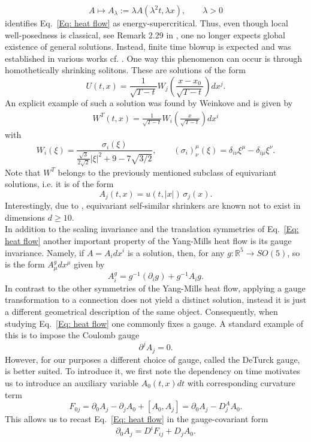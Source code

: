 \documentclass[11pt,reqno]{amsart}
\theoremstyle{remark}
\newcommand{\R}{\mathbb{R}}
\theoremstyle{definition}
\begin{document}
$$
A \mapsto A_\lambda:= \lambda A(\lambda^2 t, \lambda x),\qquad \lambda>0
$$
identifies Eq.~\eqref{Eq: heat flow} as energy-supercritical. Thus, even though local well-posedness is classical, see Remark 2.29 in \cite{OhTat22}, one no longer expects global existence of general solutions. Instead, finite time blowup is expected and was established in various works cf. \cite{Nai94,Gro01,Gas02,Wan25}. One way this phenomenon can occur is through homothetically shrinking solitons. These are solutions of the form 
$$
U(t,x)=\frac{1}{\sqrt{T-t}}W_j\left(\frac{x-x_0}{\sqrt{T-t}}\right) dx^j.
$$
An explicit example of such a solution was found by Weinkove \cite{Wei04} and is given by
\begin{align}\label{Eq; Weinkove}
W^T(t,x)=\frac{1}{\sqrt{T-t}} W_i(\frac{x}{\sqrt{T-t}}) dx^i
\end{align}
with
$$
W_i(\xi)= \frac{\sigma_i(\xi)}{\frac{\sqrt{3}}{2\sqrt{2}}|\xi|^2+9-7\sqrt{3/2}},\qquad (\sigma_i)_{\nu}^\mu(\xi)=\delta_{i\nu}\xi^\mu-\delta_{i\mu}\xi^\nu.
$$
Note that $W^T$ belongs to the previously mentioned subclass of equivariant solutions, i.e. it is of the form
\[
A_j(t,x)=u(t,|x|)\,\sigma_j(x).
\]
Interestingly, due to \cite{BizWas15}, equivariant self-similar shrinkers are known not to exist in dimensions $d\geq 10$. 
\\
In addition to the scaling invariance and the translation symmetries of Eq.~\eqref{Eq: heat flow} another important property of the Yang-Mills heat flow is its gauge invariance.
Namely, if $A=A_i dx^i$ is a solution, then, for any $g:\R^5 \to SO(5)$, so is the form $A_\mu^g dx^\mu$ given by
$$
A_i^g = g^{-1}(\partial_i g) + g^{-1} A_i g.
$$
In contrast to the other symmetries of the Yang-Mills heat flow, applying a gauge transformation to a connection does not yield a distinct solution, instead it is just a different geometrical description of the same object. Consequently, when studying  Eq.~\eqref{Eq: heat flow} one commonly fixes a gauge. A standard example of this is to impose the Coulomb gauge
$$
\partial^j A_j =0.
$$
However, for our purposes a different choice of gauge, called the DeTurck gauge, is better suited. To introduce it, we first note the dependency on time motivates us to introduce an auxiliary variable $A_0(t,x) dt$ 
 with corresponding curvature term
$$
F_{0j}=\partial_0 A_j-\partial_j A_0+[A_0,A_j]= \partial_0 A_j -D_j^A A_0.
$$
This allows us to recast Eq.~\eqref{Eq: heat flow} in the gauge-covariant form
\begin{equation*}
    \partial_0 A_j =D^i F_{ij} +D_j A_0. 
\end{equation*}
\end{document}
